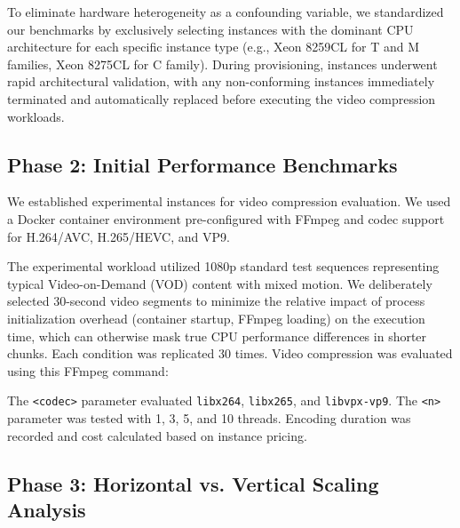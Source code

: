 \documentclass[conference]{IEEEtran}
\begin{document}
	To eliminate hardware heterogeneity as a confounding variable, we standardized our benchmarks by exclusively selecting instances with the dominant CPU architecture for each specific instance type (e.g., Xeon 8259CL for T and M families, Xeon 8275CL for C family). During provisioning, instances underwent rapid architectural validation, with any non-conforming instances immediately terminated and automatically replaced before executing the video compression workloads.
	
	\subsection{Phase 2: Initial Performance Benchmarks}
	\label{execution-initial-performance-benchmarks}
	
	We established experimental instances for video compression evaluation. We used a Docker container environment pre-configured with FFmpeg and codec support for H.264/AVC, H.265/HEVC, and VP9.
	
	The experimental workload utilized 1080p standard test sequences representing typical Video-on-Demand (VOD) content with mixed motion. We deliberately selected 30-second video segments to minimize the relative impact of process initialization overhead (container startup, FFmpeg loading) on the execution time, which can otherwise mask true CPU performance differences in shorter chunks. Each condition was replicated 30 times. Video compression was evaluated using this FFmpeg command:
	
	\begin{center}
		{\ttfamily\scriptsize
		}
	\end{center}
	
	The \texttt{<codec>} parameter evaluated \texttt{libx264}, \texttt{libx265}, and \texttt{libvpx-vp9}. The \texttt{<n>} parameter was tested with 1, 3, 5, and 10 threads. Encoding duration was recorded and cost calculated based on instance pricing.
	
	\subsection{Phase 3: Horizontal vs. Vertical Scaling Analysis}
	
\end{document}

